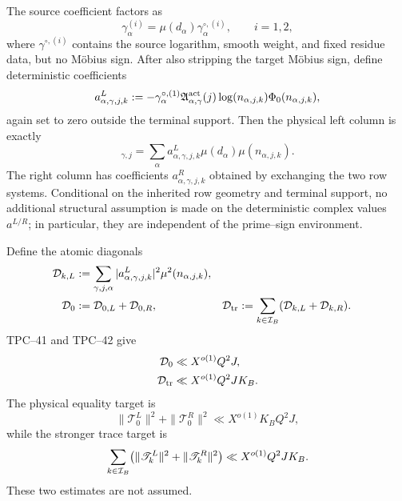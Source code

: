 The source coefficient factors as
\begin{equation}
 \gamma_\alpha^{(i)}
 =\mu(d_\alpha)\gamma_\alpha^{\circ,(i)},
 \qquad i=1,2,
 \label{eq:tpc43-strip-source-mobius}
\end{equation}
where \(\gamma^{\circ,(i)}\) contains the source logarithm, smooth
weight, and fixed residue data, but no M\"obius sign.  After also stripping
the target M\"obius sign, define deterministic coefficients
\begin{equation}
 a^L_{\alpha,\gamma,j,k}
 :=-\gamma_\alpha^{\circ,(1)}
   \mathfrak A_{\alpha,\gamma}^{\rm act}(j)
   \log(n_{\alpha,j,k})\Phi_0(n_{\alpha,j,k}),
 \label{eq:tpc43-deterministic-left-atom}
\end{equation}
again set to zero outside the terminal support.  Then the physical left
column is exactly
\begin{equation}
 [\mathscr T_k^L]_{\gamma,j}
 =\sum_\alpha
 a^L_{\alpha,\gamma,j,k}
 \mu(d_\alpha)\mu(n_{\alpha,j,k}).
 \label{eq:tpc43-physical-left}
\end{equation}
The right column has coefficients
\(a^R_{\alpha,\gamma,j,k}\) obtained by exchanging the two row systems.
Conditional on the inherited row geometry and terminal support, no
additional structural assumption is made on the deterministic complex
values \(a^{L/R}\); in particular, they are independent of the
prime--sign environment.

Define the atomic diagonals
\begin{align}
 \mathcal D_{k,L}
 &:=\sum_{\gamma,j,\alpha}
 |a^L_{\alpha,\gamma,j,k}|^2
 \mu^2(n_{\alpha,j,k}),
 \label{eq:tpc43-left-diagonal}\\
 \mathcal D_0&:=\mathcal D_{0,L}+\mathcal D_{0,R},
 &
 \mathcal D_{\rm tr}
 &:=\sum_{k\in\mathcal I_B}(\mathcal D_{k,L}+\mathcal D_{k,R}).
 \label{eq:tpc43-total-diagonals}
\end{align}
TPC--41 and TPC--42 give
\begin{align}
 \mathcal D_0&\ll X^{o(1)}Q^2J,
 \label{eq:tpc43-inherited-zero-diagonal}\\
 \mathcal D_{\rm tr}&\ll X^{o(1)}Q^2JK_B.
 \label{eq:tpc43-inherited-trace-diagonal}
\end{align}
The physical equality target is
\begin{equation}
 \|\mathscr T_0^L\|^2+\|\mathscr T_0^R\|^2
 \ll X^{o(1)}K_BQ^2J,
 \label{eq:tpc43-physical-zero-target}
\end{equation}
while the stronger trace target is
\begin{equation}
 \sum_{k\in\mathcal I_B}
 \bigl(\|\mathscr T_k^L\|^2+\|\mathscr T_k^R\|^2\bigr)
 \ll X^{o(1)}Q^2JK_B.
 \label{eq:tpc43-physical-trace-target}
\end{equation}
These two estimates are not assumed.
